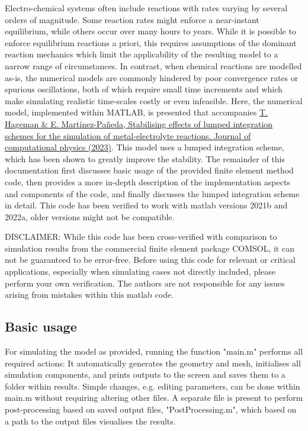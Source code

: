 \documentclass[3p]{elsarticle} %
\newcommand{\citeMe}{\href{DOI HERE}{T. Hageman \& E. Martínez-Pañeda, Stabilising effects of lumped integration schemes for the simulation of metal-electrolyte reactions. Journal of computational physics (2023)}}
\begin{document}
Electro-chemical systems often include reactions with rates varying by several orders of magnitude. Some reaction rates might enforce a near-instant equilibrium, while others occur over many hours to years. While it is possible to enforce equilibrium reactions a priori, this requires assumptions of the dominant reaction mechanics which limit the applicability of the resulting model to a narrow range of circumstances. In contrast, when chemical reactions are modelled as-is, the numerical models are commonly hindered by poor convergence rates or spurious oscillations, both of which require small time increments and which make simulating realistic time-scales costly or even infeasible. Here, the numerical model, implemented within MATLAB, is presented that accompanies \citeMe{}. This model uses a lumped integration scheme, which has been shown to greatly improve the stability. The remainder of this documentation first discusses basic usage of the provided finite element method code, then provides a more in-depth description of the implementation aspects and components of the code, and finally discusses the lumped integration scheme in detail. This code has been verified to work with matlab versions 2021b and 2022a, older versions might not be compatible. 

DISCLAIMER: While this code has been cross-verified with comparison to simulation results from the commercial finite element package COMSOL, it can not be guaranteed to be error-free. Before using this code for relevant or critical applications, especially when simulating cases not directly included, please perform your own verification. The authors are not responsible for any issues arising from mistakes within this matlab code.

\subsection{Basic usage}
For simulating the model as provided, running the function "main.m" performs all required actions: It automatically generates the geometry and mesh, initialises all simulation components, and prints outputs to the screen and saves them to a folder within results. Simple changes, e.g. editing parameters, can be done within main.m without requiring altering other files. A separate file is present to perform post-processing based on saved output files, "PostProcessing.m", which based on a path to the output files visualises the results.
\end{document}
